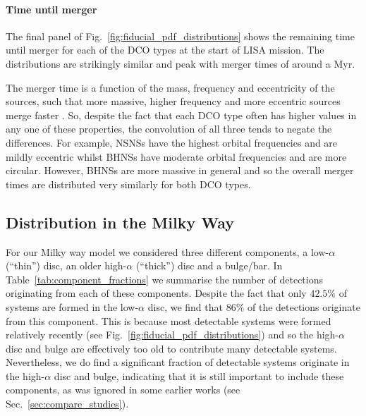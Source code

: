 
\paragraph{Time until merger} The final panel of Fig.~\ref{fig:fiducial_pdf_distributions} shows the remaining time until merger for each of the DCO types at the start of LISA mission. The distributions are strikingly similar and peak with merger times of around a Myr.

The merger time is a function of the mass, frequency and eccentricity of the sources, such that more massive, higher frequency and more eccentric sources merge faster \citep[][Eq.~5.14]{Peters+1964}. So, despite the fact that each DCO type often has higher values in any one of these properties, the convolution of all three tends to negate the differences. For example, NSNSs have the highest orbital frequencies and are mildly eccentric whilst BHNSs have moderate orbital frequencies and are more circular. However, BHNSs are more massive in general and so the overall merger times are distributed very similarly for both DCO types.

\subsection{Distribution in the Milky Way}\label{sec:mw_detectable_distribution}
For our Milky way model we considered three different components, a low-$\alpha$ (``thin'') disc, an older high-$\alpha$ (``thick'') disc and a bulge/bar. In Table~\ref{tab:component_fractions} we summarise the number of detections originating from each of these components. Despite the fact that only $42.5\%$ of systems are formed in the low-$\alpha$ disc, we find that $86\%$ of the detections originate from this component. This is because most detectable systems were formed relatively recently (see Fig.~\ref{fig:fiducial_pdf_distributions}) and so the high-$\alpha$ disc and bulge are effectively too old to contribute many detectable systems. Nevertheless, we do find a significant fraction of detectable systems originate in the high-$\alpha$ disc and bulge, indicating that it is still important to include these components, as was ignored in some earlier works (see Sec.~\ref{sec:compare_studies}).

